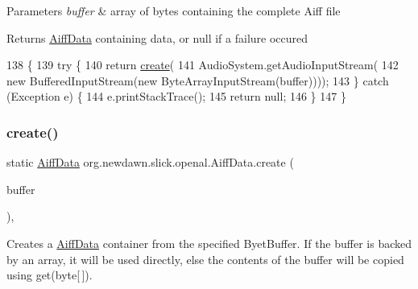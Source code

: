 \begin{DoxyParams}{Parameters}
{\em buffer} & array of bytes containing the complete Aiff file \\
\hline
\end{DoxyParams}
\begin{DoxyReturn}{Returns}
\mbox{\hyperlink{classorg_1_1newdawn_1_1slick_1_1openal_1_1_aiff_data}{Aiff\+Data}} containing data, or null if a failure occured 
\end{DoxyReturn}

\begin{DoxyCode}
138                                                  \{
139         \textcolor{keywordflow}{try} \{
140             \textcolor{keywordflow}{return} \mbox{\hyperlink{classorg_1_1newdawn_1_1slick_1_1openal_1_1_aiff_data_a0ebd8831d179c446e18751819f9045c5}{create}}(
141                 AudioSystem.getAudioInputStream(
142                     \textcolor{keyword}{new} BufferedInputStream(\textcolor{keyword}{new} ByteArrayInputStream(buffer))));
143         \} \textcolor{keywordflow}{catch} (Exception e) \{
144             e.printStackTrace();
145             \textcolor{keywordflow}{return} null;
146         \}
147     \}
\end{DoxyCode}
\mbox{\label{classorg_1_1newdawn_1_1slick_1_1openal_1_1_aiff_data_aad2615c92a623df3628a34ff787a659c}} 
\subsubsection{\texorpdfstring{create()}{create()}\hspace{0.1cm}{\footnotesize\ttfamily [5/6]}}
{\footnotesize\ttfamily static \mbox{\hyperlink{classorg_1_1newdawn_1_1slick_1_1openal_1_1_aiff_data}{Aiff\+Data}} org.\+newdawn.\+slick.\+openal.\+Aiff\+Data.\+create (\begin{DoxyParamCaption}\item[{Byte\+Buffer}]{buffer }\end{DoxyParamCaption})\hspace{0.3cm}{\ttfamily [inline]}, {\ttfamily [static]}}

Creates a \mbox{\hyperlink{classorg_1_1newdawn_1_1slick_1_1openal_1_1_aiff_data}{Aiff\+Data}} container from the specified Byet\+Buffer. If the buffer is backed by an array, it will be used directly, else the contents of the buffer will be copied using get(byte\mbox{[}$\,$\mbox{]}).


